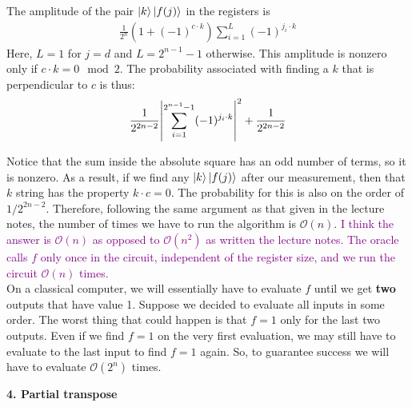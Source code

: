 \documentclass{article}
\theoremstyle{definition}
\newcommand{\f}[2]{\frac{#1}{#2}}
\begin{document}
\begin{enumerate}[label=(\alph*)]
	The amplitude of the pair $\ket{k}\ket{f(j)}$ in the registers is 
	\begin{align*}
		\f{1}{2^n}(1 + (-1)^{c\cdot k}) \sum_{i=1}^L (-1)^{j_i\cdot k}
	\end{align*} 
	Here, $L=1$ for $j=d$ and $L = 2^{n-1}-1$ otherwise. This amplitude is nonzero only if $c\cdot k = 0 \mod 2$. The probability associated with finding a $k$ that is perpendicular to $c$ is thus:
	\begin{align*}
		\f{1}{2^{2n-2}} \abs{\sum_{i=1}^{2^{n-1}-1} (-1)^{j_i\cdot k}}^2 + \f{1}{2^{2n-2}}
	\end{align*}
	
	Notice that the sum inside the absolute square has an odd number of terms, so it is nonzero. As a result, if we find any $\ket{k}\ket{f(j)}$ after our measurement, then that $k$ string has the property $k\cdot c = 0$.   The probability for this is also on the order of $1/2^{2n-2}$. Therefore, following the same argument as that given in the lecture notes, the number of times we have to run the algorithm is $\mathcal{O}(n)$. \textcolor{purple}{I think the answer is $\mathcal{O}(n)$ as opposed to $\mathcal{O}(n^2)$ as written the lecture notes. The oracle calls $f$ only once in the circuit, independent of the register size, and we run the circuit $\mathcal{O}(n)$ times.} \\
	
	
	On a classical computer, we will essentially have to evaluate $f$ until we get \textbf{two} outputs that have value 1. Suppose we decided to evaluate all inputs in some order. The worst thing that could happen is that $f=1$ only for the last two outputs. Even if we find $f=1$ on the very first evaluation, we may still have to evaluate to the last input to find $f=1$ again. So, to guarantee success we will have to evaluate $\mathcal{O}(2^n)$ times.  
	
	

\end{enumerate}



\noindent \textbf{4. Partial transpose}
\end{document}
